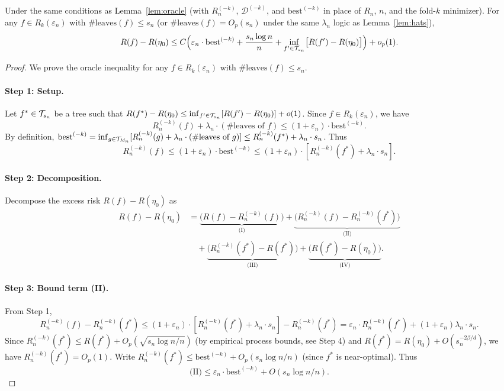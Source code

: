 \documentclass[12pt]{article}
\begin{document}
\begin{lemma}
\label{lem:oracle-near}
Under the same conditions as Lemma~\ref{lem:oracle} (with $R_n^{(-k)}$, $\mathcal{D}^{(-k)}$, and $\text{best}^{(-k)}$ in place of $R_n$, $n$, and the fold-$k$ minimizer). For any $f \in R_k(\varepsilon_n)$ with $\#\text{leaves}(f) \le s_n$ (or $\#\text{leaves}(f) = O_p(s_n)$ under the same $\lambda_n$ logic as Lemma~\ref{lem:hats}),
\[
R(f) - R(\eta_0) \le C \Bigl( \varepsilon_n \cdot \text{best}^{(-k)} + \frac{s_n \log n}{n} + \inf_{f' \in \mathcal{T}_{s_n}} \bigl[ R(f') - R(\eta_0) \bigr] \Bigr) + o_p(1).
\]
\end{lemma}
\begin{proof}
We prove the oracle inequality for any $f \in R_k(\varepsilon_n)$ with $\#\text{leaves}(f) \le s_n$.

\paragraph{Step 1: Setup.}
Let $f^* \in \mathcal{T}_{s_n}$ be a tree such that $R(f^*) - R(\eta_0) \le \inf_{f' \in \mathcal{T}_{s_n}}[R(f') - R(\eta_0)] + o(1)$. Since $f \in R_k(\varepsilon_n)$, we have
\[
R_n^{(-k)}(f) + \lambda_n \cdot (\#\text{leaves of } f) \le (1+\varepsilon_n) \cdot \text{best}^{(-k)}.
\]
By definition, $\text{best}^{(-k)} = \inf_{g \in \mathcal{T}_{M_n}} [ R_n^{(-k)}(g) + \lambda_n \cdot (\#\text{leaves of } g) ] \le R_n^{(-k)}(f^*) + \lambda_n \cdot s_n$. Thus
\[
R_n^{(-k)}(f) \le (1+\varepsilon_n) \cdot \text{best}^{(-k)} \le (1+\varepsilon_n) \cdot [ R_n^{(-k)}(f^*) + \lambda_n \cdot s_n ].
\]

\paragraph{Step 2: Decomposition.}
Decompose the excess risk $R(f) - R(\eta_0)$ as
\begin{align*}
R(f) - R(\eta_0) &= \underbrace{\bigl( R(f) - R_n^{(-k)}(f) \bigr)}_{\text{(I)}} + \underbrace{\bigl( R_n^{(-k)}(f) - R_n^{(-k)}(f^*) \bigr)}_{\text{(II)}} \\
&\quad + \underbrace{\bigl( R_n^{(-k)}(f^*) - R(f^*) \bigr)}_{\text{(III)}} + \underbrace{\bigl( R(f^*) - R(\eta_0) \bigr)}_{\text{(IV)}}.
\end{align*}

\paragraph{Step 3: Bound term (II).}
From Step 1,
\[
R_n^{(-k)}(f) - R_n^{(-k)}(f^*) \le (1+\varepsilon_n) \cdot [ R_n^{(-k)}(f^*) + \lambda_n \cdot s_n ] - R_n^{(-k)}(f^*) = \varepsilon_n \cdot R_n^{(-k)}(f^*) + (1+\varepsilon_n) \lambda_n \cdot s_n.
\]
Since $R_n^{(-k)}(f^*) \le R(f^*) + O_p(\sqrt{s_n \log n / n})$ (by empirical process bounds, see Step 4) and $R(f^*) = R(\eta_0) + O(s_n^{-2\beta/d})$, we have $R_n^{(-k)}(f^*) = O_p(1)$. Write $R_n^{(-k)}(f^*) \le \text{best}^{(-k)} + O_p(s_n \log n / n)$ (since $f^*$ is near-optimal). Thus
\[
\text{(II)} \le \varepsilon_n \cdot \text{best}^{(-k)} + O(s_n \log n / n).
\]


\end{proof}
\end{document}
